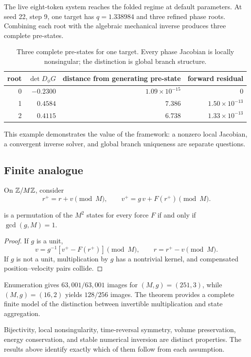 The live eight-token system reaches the folded regime at default parameters. At seed 22, step 9, one target has \(q=1.338984\) and three refined phase roots. Combining each root with the algebraic mechanical inverse produces three complete pre-states.

\begin{table}[H]
\centering
\caption{Three complete pre-states for one target. Every phase Jacobian is locally nonsingular; the distinction is global branch structure.}
\label{tab:multiroot}
\small
\begin{tabular}{@{}rrrr@{}}
\toprule
root & \(\det D_\phi G\) &
distance from generating pre-state &
forward residual\\
\midrule
0 & \(-0.2300\) & \(1.09\times10^{-15}\) & \(0\)\\
1 & \( 0.4584\) & \(7.386\) & \(1.50\times10^{-13}\)\\
2 & \( 0.4115\) & \(6.738\) & \(1.33\times10^{-13}\)\\
\bottomrule
\end{tabular}
\end{table}

This example demonstrates the value of the framework: a nonzero local Jacobian, a convergent inverse solver, and global branch uniqueness are separate questions.

\subsection{Finite analogue}

On \(\mathbb Z/M\mathbb Z\), consider
\begin{equation}
r^+=r+v\pmod M,
\qquad
v^+=g\,v+F(r^+)\pmod M.
\label{eq:finite-map}
\end{equation}

\begin{theorem}
\label{thm:finite}
 is a permutation of the \(M^2\) states for every force \(F\) if and only if \(\gcd(g,M)=1\).
\end{theorem}

\begin{proof}
If \(g\) is a unit,
\[
v=g^{-1}[v^+-F(r^+)]\pmod M,
\qquad
r=r^+-v\pmod M.
\]
If \(g\) is not a unit, multiplication by \(g\) has a nontrivial kernel, and compensated position--velocity pairs collide.
\end{proof}

Enumeration gives \(63{,}001/63{,}001\) images for \((M,g)=(251,3)\), while \((M,g)=(16,2)\) yields \(128/256\) images. The theorem provides a complete finite model of the distinction between invertible multiplication and state aggregation.

\begin{remark}
Bijectivity, local nonsingularity, time-reversal symmetry, volume preservation, energy conservation, and stable numerical inversion are distinct properties. The results above identify exactly which of them follow from each assumption.
\end{remark}
